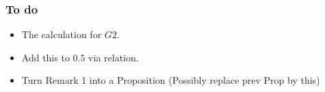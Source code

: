 \documentclass[a4 paper, 10pt]{article}
\begin{document}
\subsubsection*{To do}
\begin{itemize}
\item The calculation for $G2$.
\item Add this to $0.5$ via relation.
\item Turn Remark 1 into a Proposition (Possibly replace prev Prop by this)
\end{itemize}


\end{document}
